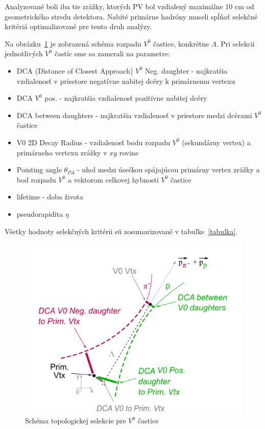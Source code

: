 \documentclass[thesismargins, thesislinespacing]{rnthesis}
\begin{document}
Analyzované boli iba tie zrážky, ktorých PV bol vzdialený maximálne 10 cm od geometrického stredu detektora. Nabité primárne hadróny museli spĺňať selekčné kritériá optimalizované pre tento druh analýzy.

Na obrázku~\ref{schema} je zobrazená schéma rozpadu $V^0$ častice, konkrétne $\Lambda$. Pri selekcii jednotlivých $V^0$ častíc sme sa zamerali na parametre:
\begin{itemize}
	\item DCA (Distance of Closest Approach) $V^0$ Neg. daughter - najkratšia vzdialenosť v priestore negatívne nabitej dcéry k primárnemu vertexu
	\item DCA $V^0$ pos. - najkratšia vzdialenosť pozitívne nabitej dcéry
	\item DCA between daughters - najkratšia vzdialenosť v priestore medzi dcérami $V^0$ častice
	\item V0 2D Decay Radius  - vzdialenosť bodu rozpadu $V^0$ (sekundárny vertex) a primárneho vertexu zrážky v $xy$ rovine
	\item Pointing angle $\theta_{PA}$ - uhol medzi úsečkou spájajúcou primárny vertex zrážky a bod rozpadu $V^0$ a vektorom celkovej hybnosti $V^0$ častice
	\item lifetime - doba života
	\item pseudorapidita $\eta$
\end{itemize} 
Všetky hodnoty selekčných kritérii sú zosumarizované v tabuľke~\ref{tabulka}.

\begin{figure}[hbtp!]
	\centering
	\includegraphics[scale=0.8]{./Obrazky_praca/SchemaV0.png}
	\caption{Schéma topologickej selekcie pre $V^0$ častice~\cite{schema}}
	\label{schema} 
\end{figure}
\end{document}
